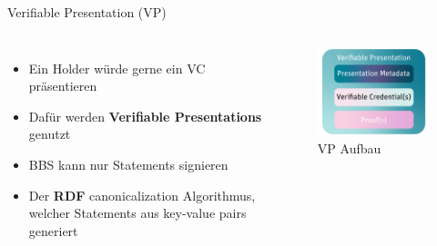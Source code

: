\documentclass[
	german,%
	authorontitle=true,
	]{bfhbeamer}
\begin{document}
\begin{frame}{Verifiable Presentation (VP)}
    \begin{columns}[onlytextwidth,T]
        \column{70mm}  
        \begin{itemize}
            \item Ein Holder würde gerne ein VC präsentieren
            \item Dafür werden \textbf{Verifiable Presentations} genutzt
            \item BBS kann nur Statements signieren
            \item Der \textbf{RDF} canonicalization Algorithmus, welcher Statements aus key-value pairs generiert
        \end{itemize}

        \column{70mm}

        \begin{figure}
            \centering
            \includegraphics[width=70mm]{../img/VP.png}
            \caption{VP Aufbau}
        \end{figure}

    \end{columns}
\end{frame}
\end{document}
